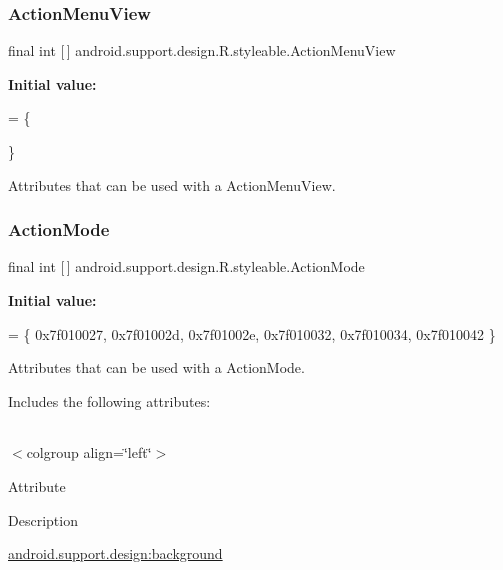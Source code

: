 \subsubsection{\texorpdfstring{Action\+Menu\+View}{ActionMenuView}}
{\footnotesize\ttfamily final int \mbox{[}$\,$\mbox{]} android.\+support.\+design.\+R.\+styleable.\+Action\+Menu\+View\hspace{0.3cm}{\ttfamily [static]}}

{\bfseries Initial value\+:}
\begin{DoxyCode}
= \{
            
        \}
\end{DoxyCode}
Attributes that can be used with a Action\+Menu\+View. \mbox{\label{classandroid_1_1support_1_1design_1_1R_1_1styleable_aece7cc3345738baf4a59955f870e1507}} 
\subsubsection{\texorpdfstring{Action\+Mode}{ActionMode}}
{\footnotesize\ttfamily final int \mbox{[}$\,$\mbox{]} android.\+support.\+design.\+R.\+styleable.\+Action\+Mode\hspace{0.3cm}{\ttfamily [static]}}

{\bfseries Initial value\+:}
\begin{DoxyCode}
= \{
            0x7f010027, 0x7f01002d, 0x7f01002e, 0x7f010032,
            0x7f010034, 0x7f010042
        \}
\end{DoxyCode}
Attributes that can be used with a Action\+Mode. 

Includes the following attributes\+:

\tabulinesep=1mm
\begin{longtabu} spread 0pt [c]{*{0}{|X[-1]}|}
\hline
\end{longtabu}
$<$colgroup align=\char`\"{}left\char`\"{}$>$ 

Attribute

Description 

{\ttfamily \hyperlink{classandroid_1_1support_1_1design_1_1R_1_1styleable_a81bc07a1276ce6af7fef73c2de25aec8}{android.\+support.\+design\+:background}}

